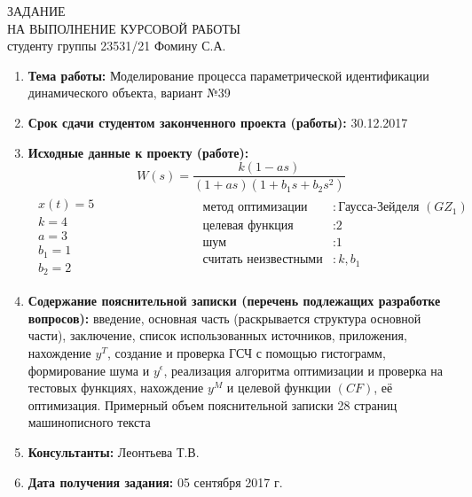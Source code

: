 \newpage
\thispagestyle{empty}
\begin{center}
    ЗАДАНИЕ\\
    НА ВЫПОЛНЕНИЕ КУРСОВОЙ РАБОТЫ \\[1ex]
    студенту группы 23531/21 Фомину С.А.
\end{center}

\vspace{0.5cm}

\begin{enumerate}
    \item
        \textbf{Тема работы:} Моделирование процесса параметрической идентификации динамического объекта, вариант №39
    \item
        \textbf{Срок сдачи студентом законченного проекта (работы):} 30.12.2017
    \item
        \textbf{Исходные данные к проекту (работе):}
            $$W(s) = \frac{k(1-as)}{(1+as)(1+b_1s+b_2s^2)}$$
            $$
                \begin{matrix}
                    \begin{aligned}
                        x(t) = 5 \\
                        k = 4 \\
                        a = 3 \\
                        b_1 = 1 \\
                        b_2 = 2
                    \end{aligned}
                    &
                    \hspace{3cm}
                    \begin{aligned}
                        \text{метод оптимизации}&: \text{Гаусса-Зейделя $(GZ_1)$} \\
                        \text{целевая функция}&: \text{2} \\
                        \text{шум}&: \text{1} \\
                        \text{считать неизвестными}&: \text{$k, b_1$} \\
                    \end{aligned}
                \end{matrix}
            $$
    \item
        \textbf{Содержание пояснительной записки (перечень подлежащих разработке вопросов):} введение, основная часть (раскрывается структура основной части), заключение, список использованных источников, приложения, нахождение $y^T$, создание и проверка ГСЧ с помощью гистограмм, формирование шума и $y^\epsilon$, реализация алгоритма оптимизации и проверка на тестовых функциях, нахождение $y^M$ и целевой функции $(CF)$, её оптимизация. Примерный объем пояснительной записки 28 страниц машинописного текста
    \item
        \textbf{Консультанты:} Леонтьева Т.В.
    \item
        \textbf{Дата получения задания:} 05 сентября 2017 г.
\end{enumerate}

